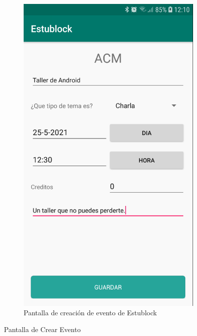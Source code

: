 \begin{figure}[hbt]
\begin{subfigure}[b]{0.4\linewidth}
        \includegraphics[width=0.7\linewidth]{figs/Desarrollo/Interfaz/estublock_crear_evento_completo.png}
        \caption[Estublock Crear Evento]{Pantalla de creación de evento de Estublock}
	\end{subfigure} 
	\caption[Pantalla de Crear Evento]{Pantalla de Crear Evento}
	\label{fig:pantalla_crear_evento}
\end{figure}

